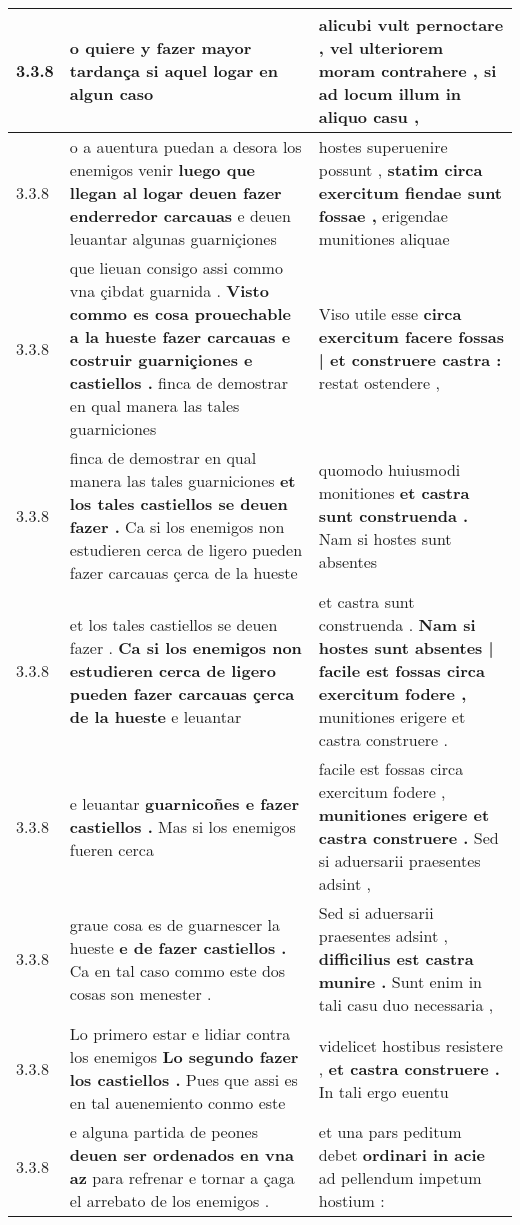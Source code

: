 \begin{tabular}{|p{1cm}|p{6.5cm}|p{6.5cm}|}
3.3.8 & o quiere \textbf{ y fazer mayor tardança } si aquel logar en algun caso & alicubi vult pernoctare , \textbf{ vel ulteriorem moram contrahere , } si ad locum illum in aliquo casu , \\\hline
3.3.8 & o a auentura puedan a desora los enemigos venir \textbf{ luego que llegan al logar deuen fazer enderredor carcauas } e deuen leuantar algunas guarniçiones & hostes superuenire possunt , \textbf{ statim circa exercitum fiendae sunt fossae , } erigendae munitiones aliquae \\\hline
3.3.8 & que lieuan consigo assi commo vna çibdat guarnida . \textbf{ Visto commo es cosa prouechable a la hueste fazer carcauas e costruir guarniçiones e castiellos . } finca de demostrar en qual manera las tales guarniciones & Viso utile esse \textbf{ circa exercitum facere fossas | et construere castra : } restat ostendere , \\\hline
3.3.8 & finca de demostrar en qual manera las tales guarniciones \textbf{ et los tales castiellos se deuen fazer . } Ca si los enemigos non estudieren cerca de ligero pueden fazer carcauas çerca de la hueste & quomodo huiusmodi monitiones \textbf{ et castra sunt construenda . } Nam si hostes sunt absentes \\\hline
3.3.8 & et los tales castiellos se deuen fazer . \textbf{ Ca si los enemigos non estudieren cerca de ligero pueden fazer carcauas çerca de la hueste } e leuantar & et castra sunt construenda . \textbf{ Nam si hostes sunt absentes | facile est fossas circa exercitum fodere , } munitiones erigere et castra construere . \\\hline
3.3.8 & e leuantar \textbf{ guarnicoñes e fazer castiellos . } Mas si los enemigos fueren cerca & facile est fossas circa exercitum fodere , \textbf{ munitiones erigere et castra construere . } Sed si aduersarii praesentes adsint , \\\hline
3.3.8 & graue cosa es de guarnescer la hueste \textbf{ e de fazer castiellos . } Ca en tal caso commo este dos cosas son menester . & Sed si aduersarii praesentes adsint , \textbf{ difficilius est castra munire . } Sunt enim in tali casu duo necessaria , \\\hline
3.3.8 & Lo primero estar e lidiar contra los enemigos \textbf{ Lo segundo fazer los castiellos . } Pues que assi es en tal auenemiento conmo este & videlicet hostibus resistere , \textbf{ et castra construere . } In tali ergo euentu \\\hline
3.3.8 & e alguna partida de peones \textbf{ deuen ser ordenados en vna az } para refrenar e tornar a çaga el arrebato de los enemigos . & et una pars peditum debet \textbf{ ordinari in acie } ad pellendum impetum hostium : \\\hline

\end{tabular}

